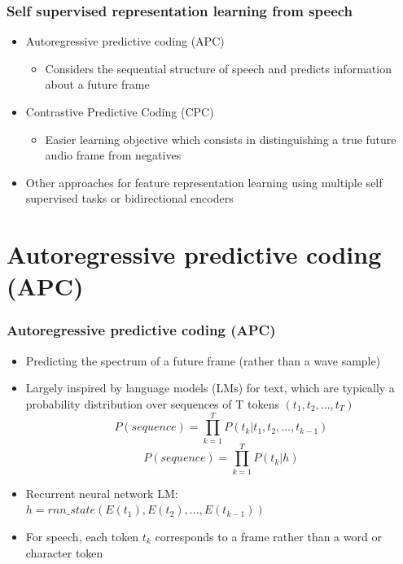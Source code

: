 \documentclass[table]{beamer}
\begin{document}






\begin{frame}
\frametitle{Self supervised representation learning from speech}
\begin{itemize}
	\item Autoregressive predictive coding (APC) \citep{DBLP:journals/corr/abs-1904-03240,chung2020improved}
		\begin{itemize}
		\item Considers the sequential structure of speech and predicts information about a future frame
		\end{itemize}
	\item Contrastive Predictive Coding (CPC) \citep{Baevski, Schneider2019,morgane}
		\begin{itemize}
		\item Easier learning objective which consists in distinguishing a true future audio frame from negatives
		\end{itemize}	
	\item Other approaches for feature representation learning using multiple self supervised tasks \citep{pascual2019,ravanelli2020multitask} or bidirectional encoders \citep{song2019speechxlnet,Liu_2020, wang2020unsupervised}
\end{itemize} 
\end{frame}






\section{Autoregressive predictive coding (APC)}

\begin{frame}
\frametitle{Autoregressive predictive coding (APC)}
\begin{itemize}
\item Predicting the spectrum of a future frame (rather than a wave sample)
\item Largely inspired by language models (LMs) for text, which are typically a probability distribution over sequences of T tokens $(t_1,t_2,...,t_T )$
\begin{equation}
	P(sequence) = \prod_{k=1}^{T} P(t{_{k}}|t{_{1}},t{_{2}},...,t{_{k-1}})
\end{equation}
\begin{equation}
	P(sequence) = \prod_{k=1}^{T} P(t{_{k}}|h)
\end{equation}
\item Recurrent neural network LM: $h=rnn\_state(E(t{_{1}}),E(t{_{2}}),...,E(t{_{k-1}}))$
\item For speech, each token $t_k$ corresponds to a frame rather than a word or character token
\end{itemize} 
\end{frame}
\end{document}
